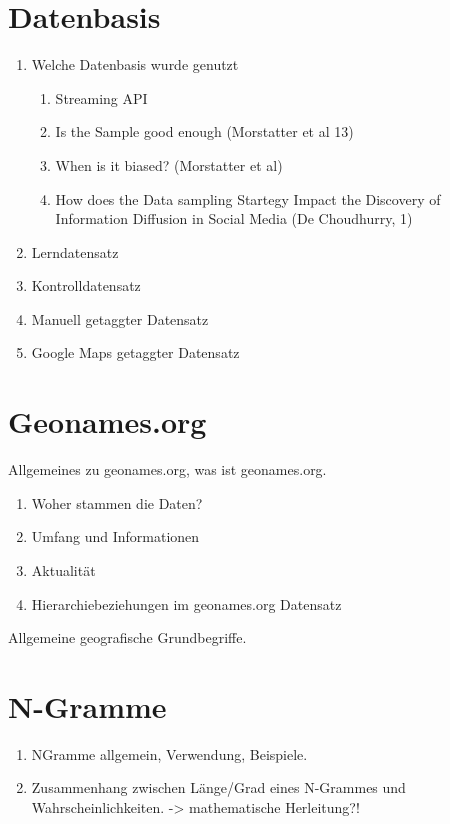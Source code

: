 	\section{Datenbasis}
		\begin{enumerate}
			\item Welche Datenbasis wurde genutzt 
				\begin{enumerate}
					\item Streaming API
					\item Is the Sample good enough (Morstatter et al 13)
					\item When is it biased? (Morstatter et al)
					\item How does the Data sampling Startegy Impact the Discovery of Information Diffusion in Social Media (De Choudhurry, 1)
				\end{enumerate}
			\item Lerndatensatz
			\item Kontrolldatensatz
			\item Manuell getaggter Datensatz
			\item Google Maps getaggter Datensatz
		\end{enumerate}			
	
	\section{Geonames.org}
		Allgemeines zu geonames.org, was ist geonames.org. 
		\begin{enumerate}
			\item Woher stammen die Daten?
			\item Umfang und Informationen
			\item Aktualität
			\item Hierarchiebeziehungen im geonames.org Datensatz
		\end{enumerate}			
		 Allgemeine geografische Grundbegriffe.

	\section{N-Gramme}
		\begin{enumerate}
			\item NGramme allgemein, Verwendung, Beispiele. 
			\item {} Zusammenhang zwischen Länge/Grad eines N-Grammes und Wahrscheinlichkeiten. -> mathematische Herleitung?!
		\end{enumerate}

